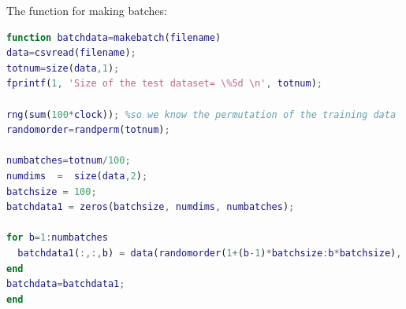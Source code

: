 \documentclass{article}
\begin{document}
The function for making batches:
\begin{lstlisting}[language=Matlab]
function batchdata=makebatch(filename)
data=csvread(filename);
totnum=size(data,1);
fprintf(1, 'Size of the test dataset= \%5d \n', totnum);

rng(sum(100*clock)); %so we know the permutation of the training data
randomorder=randperm(totnum);

numbatches=totnum/100;
numdims  =  size(data,2);
batchsize = 100;
batchdata1 = zeros(batchsize, numdims, numbatches);

for b=1:numbatches
  batchdata1(:,:,b) = data(randomorder(1+(b-1)*batchsize:b*batchsize), :);
end
batchdata=batchdata1;
end
\end{lstlisting}
 
\end{document}
